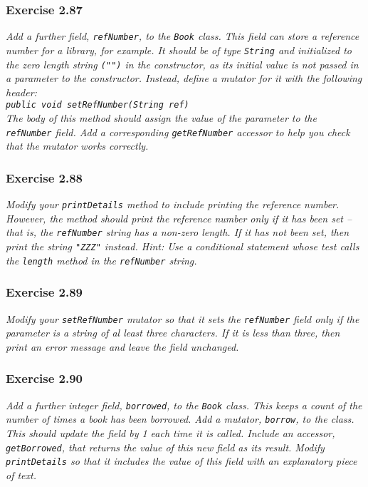 \subsubsection*{Exercise 2.87}
\textit{Add a further field, \lstinline{refNumber}, to the \lstinline{Book} 
class. This field can store a reference number for a library, for example. It 
should be of type \lstinline{String} and initialized to the zero length string 
\lstinline{("")} in the constructor, as its initial value is not passed in a 
parameter to the constructor. Instead, define a mutator for it with the 
following header: \\
\lstinline{public void setRefNumber(String ref)}\\
The body of this method should assign the value of the parameter to the 
\lstinline{refNumber} field. Add a corresponding \lstinline{getRefNumber} 
accessor to help you check that the mutator works correctly. }\\

\subsubsection*{Exercise 2.88}
\textit{Modify your \lstinline{printDetails} method to include printing the 
reference number. However, the method should print the reference number only 
if it has been set -- that is, the \lstinline{refNumber} string has a non-zero 
length. If it has not been set, then print the string \lstinline{"ZZZ"} 
instead. Hint: Use a conditional statement whose test calls the 
\lstinline{length} method in the \lstinline{refNumber} string. }\\

\subsubsection*{Exercise 2.89}
\textit{Modify your \lstinline{setRefNumber} mutator so that it sets the 
\lstinline{refNumber} field only if the parameter is a string of al least 
three characters. If it is less than three, then print an error message and 
leave the field unchanged. }\\

\subsubsection*{Exercise 2.90}
\textit{Add a further integer field, \lstinline{borrowed}, to the 
\lstinline{Book} class. This keeps a count of the number of times a book has 
been borrowed. Add a mutator, \lstinline{borrow}, to the class. This should 
update the field by 1 each time it is called. Include an accessor, 
\lstinline{getBorrowed}, that returns the value of this new field as its 
result. Modify \lstinline{printDetails} so that it includes the value of this 
field with an explanatory piece of text. }\\

